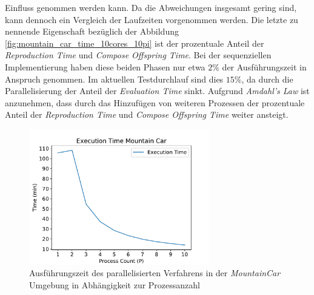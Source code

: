 Einfluss genommen werden kann. Da die Abweichungen insgesamt gering sind, kann dennoch ein Vergleich der Laufzeiten vorgenommen werden. Die letzte zu nennende Eigenschaft bezüglich der Abbildung \ref{fig:mountain_car_time_10cores_10pi} ist der prozentuale Anteil der \emph{Reproduction Time} und \emph{Compose Offspring Time}. Bei der sequenziellen Implementierung haben diese beiden Phasen nur etwa $2\%$ der Ausführungszeit in Anspruch genommen. Im aktuellen Testdurchlauf sind dies $15\%$, da durch die Parallelisierung der Anteil der \emph{Evaluation Time} sinkt. Aufgrund \emph{Amdahl's Law} ist anzunehmen, dass durch das Hinzufügen von weiteren Prozessen der prozentuale Anteil der \emph{Reproduction Time} und \emph{Compose Offspring Time} weiter ansteigt.
\begin{figure}[!h]
	\centering
	\includegraphics[width=0.7\textwidth]{./img/mountain_car_analysis/time_mountain_car_1_10.pdf} 
	\caption{Ausführungszeit des parallelisierten Verfahrens in der \emph{MountainCar} Umgebung in Abhängigkeit zur Prozessanzahl}
	\label{fig:execution_time_mountain_car_1_10}
\end{figure}
\\ \noindent
